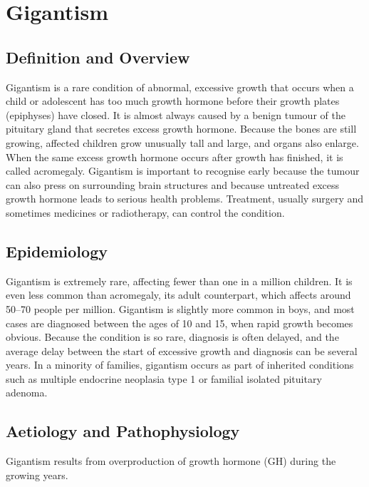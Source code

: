 \chapter{Gigantism}

\section*{Definition and Overview}
Gigantism is a rare condition of abnormal, excessive growth that occurs when a child or adolescent has too much growth hormone before their growth plates (epiphyses) have closed. It is almost always caused by a benign tumour of the pituitary gland that secretes excess growth hormone. Because the bones are still growing, affected children grow unusually tall and large, and organs also enlarge. When the same excess growth hormone occurs after growth has finished, it is called acromegaly. Gigantism is important to recognise early because the tumour can also press on surrounding brain structures and because untreated excess growth hormone leads to serious health problems. Treatment, usually surgery and sometimes medicines or radiotherapy, can control the condition.

\section*{Epidemiology}
Gigantism is extremely rare, affecting fewer than one in a million children. It is even less common than acromegaly, its adult counterpart, which affects around 50--70 people per million. Gigantism is slightly more common in boys, and most cases are diagnosed between the ages of 10 and 15, when rapid growth becomes obvious. Because the condition is so rare, diagnosis is often delayed, and the average delay between the start of excessive growth and diagnosis can be several years. In a minority of families, gigantism occurs as part of inherited conditions such as multiple endocrine neoplasia type 1 or familial isolated pituitary adenoma.

\section*{Aetiology and Pathophysiology}
Gigantism results from overproduction of growth hormone (GH) during the growing years.

